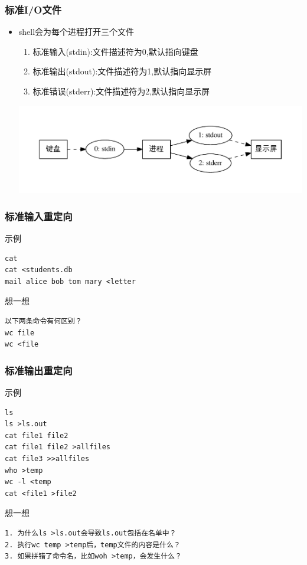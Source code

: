 \documentclass[xcolor=svgnames,presentation]{beamer}
\begin{document}
\begin{frame}
\frametitle{标准I/O文件}
\label{sec-2-1-3}
\begin{itemize}

\item shell会为每个进程打开三个文件
\label{sec-2-1-3-1}%
\begin{enumerate}
\item 标准输入(stdin):文件描述符为0,默认指向键盘
\item 标准输出(stdout):文件描述符为1,默认指向显示屏
\item 标准错误(stderr):文件描述符为2,默认指向显示屏
\end{enumerate}
\includegraphics[width=.9\linewidth]{img/stdio.pdf}
\end{itemize} %
\end{frame}
\begin{frame}[fragile]
\frametitle{标准输入重定向}
\label{sec-2-1-4}
\begin{exampleblock}{示例}
\label{sec-2-1-4-1}


\begin{verbatim}
cat
cat <students.db
mail alice bob tom mary <letter
\end{verbatim}
\end{exampleblock}
\begin{block}{想一想}
\label{sec-2-1-4-2}


\begin{verbatim}
以下两条命令有何区别？
wc file
wc <file
\end{verbatim}
\end{block}
\end{frame}
\begin{frame}[fragile]
\frametitle{标准输出重定向}
\label{sec-2-1-5}
\begin{exampleblock}{示例}
\label{sec-2-1-5-1}


\begin{verbatim}
ls
ls >ls.out
cat file1 file2
cat file1 file2 >allfiles
cat file3 >>allfiles
who >temp
wc -l <temp
cat <file1 >file2
\end{verbatim}
\end{exampleblock}
\begin{block}{想一想}
\label{sec-2-1-5-2}


\begin{verbatim}
1. 为什么ls >ls.out会导致ls.out包括在名单中？
2. 执行wc temp >temp后，temp文件的内容是什么？
3. 如果拼错了命令名，比如woh >temp，会发生什么？
\end{verbatim}
\end{block}
\end{frame}
\end{document}
